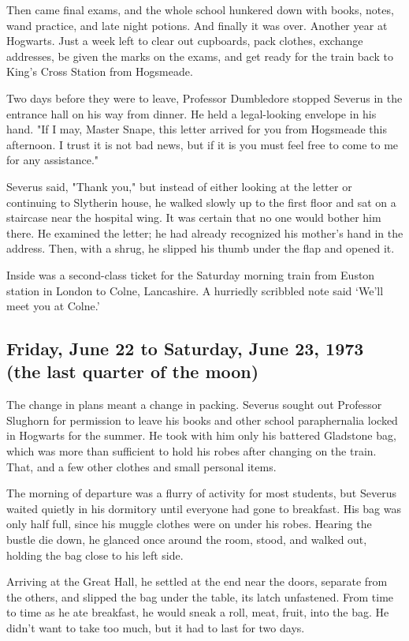 Then came final exams, and the whole school hunkered down with books, notes, wand practice, and late night potions. And finally it was over. Another year at Hogwarts. Just a week left to clear out cupboards, pack clothes, exchange addresses, be given the marks on the exams, and get ready for the train back to King's Cross Station from Hogsmeade.

Two days before they were to leave, Professor Dumbledore stopped Severus in the entrance hall on his way from dinner. He held a legal-looking envelope in his hand. "If I may, Master Snape, this letter arrived for you from Hogsmeade this afternoon. I trust it is not bad news, but if it is you must feel free to come to me for any assistance."

Severus said, "Thank you," but instead of either looking at the letter or continuing to Slytherin house, he walked slowly up to the first floor and sat on a staircase near the hospital wing. It was certain that no one would bother him there. He examined the letter; he had already recognized his mother's hand in the address. Then, with a shrug, he slipped his thumb under the flap and opened it.

Inside was a second-class ticket for the Saturday morning train from Euston station in London to Colne, Lancashire. A hurriedly scribbled note said `We'll meet you at Colne.'

\subsection{Friday, June 22 to Saturday, June 23, 1973 \\ (the last quarter of the moon)}

The change in plans meant a change in packing. Severus sought out Professor Slughorn for permission to leave his books and other school paraphernalia locked in Hogwarts for the summer. He took with him only his battered Gladstone bag, which was more than sufficient to hold his robes after changing on the train. That, and a few other clothes and small personal items.

The morning of departure was a flurry of activity for most students, but Severus waited quietly in his dormitory until everyone had gone to breakfast. His bag was only half full, since his muggle clothes were on under his robes. Hearing the bustle die down, he glanced once around the room, stood, and walked out, holding the bag close to his left side.

Arriving at the Great Hall, he settled at the end near the doors, separate from the others, and slipped the bag under the table, its latch unfastened. From time to time as he ate breakfast, he would sneak a roll, meat, fruit, into the bag. He didn't want to take too much, but it had to last for two days.

